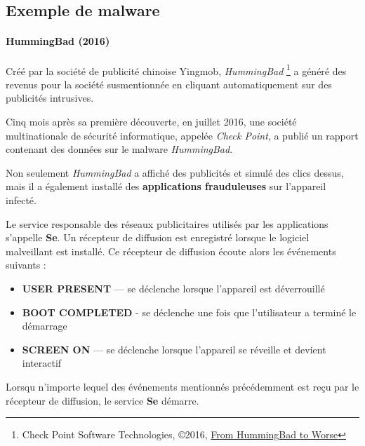 \documentclass[
  french,
  paper=a4,
  ,captions=tableheading
]{scrartcl}
\begin{document}
\hypertarget{exemple-de-malware}{%
\subsection{Exemple de malware}\label{exemple-de-malware}}

\hypertarget{hummingbad-2016}{%
\paragraph{HummingBad (2016)}\label{hummingbad-2016}}

\begin{flushleft}
Créé par la société de publicité chinoise Yingmob, \emph{HummingBad}
\footnote{Check Point Software Technologies, ©2016,
  \href{https://blog.checkpoint.com/wp-content/uploads/2016/07/HummingBad-Research-report_FINAL-62916.pdf}{From
  HummingBad to Worse}} a généré des revenus pour la société
susmentionnée en cliquant automatiquement sur des publicités intrusives.
\end{flushleft}
Cinq mois après sa première découverte, en juillet 2016, une société
multinationale de sécurité informatique, appelée \emph{Check Point}, a
publié un rapport contenant des données sur le malware
\emph{HummingBad}.

Non seulement \emph{HummingBad} a affiché des publicités et simulé des
clics dessus, mais il a également installé des \textbf{applications
frauduleuses} sur l'appareil infecté.

\newpage

Le service responsable des réseaux publicitaires utilisés par les
applications s'appelle \textbf{Se}. Un récepteur de diffusion est
enregistré lorsque le logiciel malveillant est installé. Ce récepteur de
diffusion écoute alors les événements suivants :

\begin{itemize}
\item
  \textbf{USER PRESENT} --- se déclenche lorsque l'appareil est
  déverrouillé
\item
  \textbf{BOOT COMPLETED} - se déclenche une fois que l'utilisateur a
  terminé le démarrage
\item
  \textbf{SCREEN ON} --- se déclenche lorsque l'appareil se réveille et
  devient interactif
\end{itemize}

Lorsqu n'importe lequel des événements mentionnés précédemment est reçu
par le récepteur de diffusion, le service \textbf{Se} démarre.
\end{document}
